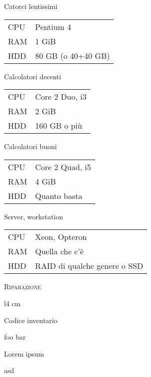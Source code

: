 \documentclass[a4paper,11pt,twoside]{article}
\newcommand{\titoletto}[1]{\begin{centering}{\small #1\par}\end{centering}\vspace{1em}}
\begin{document}
\pagestyle{empty}
\begin{minipage}{.32\textwidth}
	\begin{framed}
		\titoletto{Catorci lentissimi}
		\begin{tabular}{l p{3cm}}
			CPU & Pentium 4\\
			RAM & 1 GiB\\
			HDD & 80 GB \newline (o 40+40 GB)\\
		\end{tabular}
	\end{framed}
\end{minipage}%
\hfill
\begin{minipage}{.32\textwidth}
	\begin{framed}
		\titoletto{Calcolatori decenti}
		\begin{tabular}{l p{3cm}}
			CPU & Core 2 Duo, i3\\
			RAM & 2 GiB\\
			HDD & 160 GB o pi\`u\newline \\
		\end{tabular}
	\end{framed}
\end{minipage}%
\hfill
\begin{minipage}{.32\textwidth}
	\begin{framed}
		\titoletto{Calcolatori buoni}
		\begin{tabular}{l p{3cm}}
			CPU & Core 2 Quad, i5\\
			RAM & 4 GiB\\
			HDD & Quanto basta\newline \\
		\end{tabular}
	\end{framed}
\end{minipage}%
\vspace{.016\textwidth}
\begin{minipage}{.32\textwidth}
	\begin{framed}
		\titoletto{Server, workstation}
		\begin{tabular}{l p{3cm}}
			CPU & Xeon, Opteron\\
			RAM & Quella che c'\`e\\
			HDD & RAID di qualche genere o SSD\newline \\
		\end{tabular}
	\end{framed}
\end{minipage}


{\Large\textsc{Riparazione}}\par



\begin{wrapfigure}{l}{4 cm}
	\vspace{-0.5cm}
	\begin{framed}
		\begin{centering}
		{\footnotesize Codice inventario\par}
		\vspace{2.4cm}
		\end{centering}		
	\end{framed}
	\vspace{-1.4cm}
\end{wrapfigure}
foo bar

Lorem ipsum

asd
\end{document}

